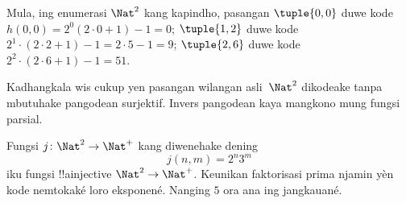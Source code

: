 \documentclass[../../../include/open-logic-section]{subfiles}
\begin{document}
\begin{explain}
Mula, ing enumerasi $\Nat^2$ kang kapindho, pasangan
$\tuple{0,0}$ duwe kode $h(0,0) = 2^0(2\cdot 0+1) - 1 = 0$;
$\tuple{1,2}$ duwe kode $2^{1} \cdot (2 \cdot 2 + 1) - 1 = 2
\cdot 5 - 1 = 9$; $\tuple{2,6}$ duwe kode $2^{2} \cdot (2
\cdot 6 + 1) - 1 = 51$.
\end{explain}

Kadhangkala wis cukup yen pasangan wilangan asli~$\Nat^2$ dikodeake
tanpa mbutuhake pangodean surjektif. Invers pangodean kaya mangkono
mung fungsi parsial.

\begin{ex}
Fungsi $j\colon \Nat^2 \to \Nat^+$ kang diwenehake dening
\[
j(n,m) = 2^n3^m
\]
iku fungsi !!a{injective} $\Nat^2 \to \Nat^+$.
Keunikan faktorisasi prima njamin yèn kode nemtokaké loro eksponené.
Nanging $5$ ora ana ing jangkauané.
\end{ex}
\end{document}
